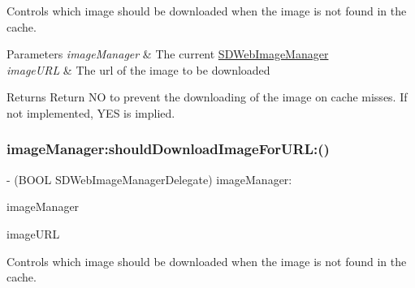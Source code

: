 Controls which image should be downloaded when the image is not found in the cache.


\begin{DoxyParams}{Parameters}
{\em image\+Manager} & The current {\ttfamily \mbox{\hyperlink{interface_s_d_web_image_manager}{S\+D\+Web\+Image\+Manager}}} \\
\hline
{\em image\+U\+RL} & The url of the image to be downloaded\\
\hline
\end{DoxyParams}
\begin{DoxyReturn}{Returns}
Return NO to prevent the downloading of the image on cache misses. If not implemented, Y\+ES is implied. 
\end{DoxyReturn}
\mbox{\label{protocol_s_d_web_image_manager_delegate_01-p_abb8b74284f0c06034a5a3b4f5da4f45e}} 
\subsubsection{\texorpdfstring{image\+Manager\+:should\+Download\+Image\+For\+U\+R\+L\+:()}{imageManager:shouldDownloadImageForURL:()}\hspace{0.1cm}{\footnotesize\ttfamily [3/3]}}
{\footnotesize\ttfamily -\/ (B\+O\+OL S\+D\+Web\+Image\+Manager\+Delegate) image\+Manager\+: \begin{DoxyParamCaption}\item[{(\mbox{\hyperlink{interface_s_d_web_image_manager}{S\+D\+Web\+Image\+Manager}} $\ast$)}]{image\+Manager }\item[{shouldDownloadImageForURL:(N\+S\+U\+RL $\ast$)}]{image\+U\+RL }\end{DoxyParamCaption}\hspace{0.3cm}{\ttfamily [optional]}}

Controls which image should be downloaded when the image is not found in the cache.


